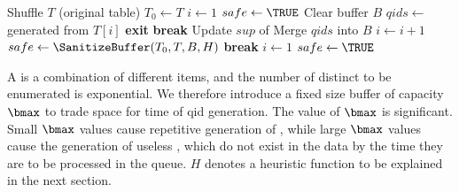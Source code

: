 
\begin{algorithm2e}[h]
\small
\caption{$\PartialSuppression(T,\bmax)$}
\label{algo:partialsuppression}
\begin{algorithmic}[1]
\STATE Shuffle $T$ (original table)
\STATE $T_0 \gets T$ %
\STATE $i\leftarrow 1$
\STATE $safe \leftarrow \TRUE$
    \LOOP
        \STATE Clear buffer $B$
         \label{algo:enu_s}
            \STATE $qids \gets$ \qids generated from $T[i]$
		\STATE \textbf{exit}
                \STATE \textbf{break}
            \ELSE
	     \STATE Update $sup$ of \qids \label{algo:enumerate2}
             \STATE Merge $qids$ into $B$ \label{algo:enumerate1}
             \STATE $i\leftarrow i+1$
            \ENDIF
        \ENDWHILE \label{algo:enu_e}
        \STATE $safe \leftarrow \SanitizeBuffer(T_0, T, B, H)$\label{line:sanitizebuffer}
                \STATE \textbf{break}\label{algo:partialbreak}
            \ELSE
                \STATE $i\leftarrow 1$
                \STATE $safe\leftarrow\TRUE$
            \ENDIF
        \ENDIF
    \ENDLOOP
\end{algorithmic}
\end{algorithm2e}

A \qid is a combination of different items,
and the number of distinct \qids to be enumerated is exponential.
We therefore introduce a fixed size \qid buffer of
capacity $\bmax$ to trade space for time of qid generation.
The value of $\bmax$ is significant. Small $\bmax$ values cause
repetitive generation of \qids, while large $\bmax$ values cause the generation
of useless \qids, which do not exist in the data
by the time they are to be processed in the queue. 
$H$ denotes a heuristic function to be explained 
in the next section.

